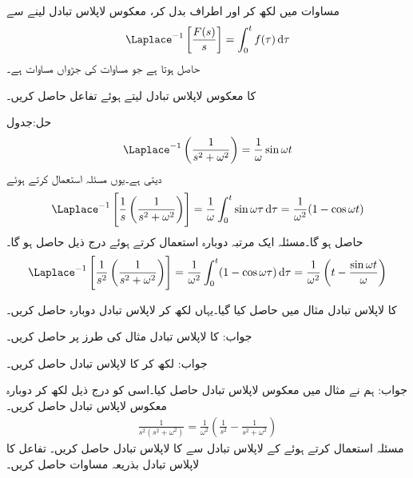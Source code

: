 مساوات  میں  لکھ کر اور اطراف بدل کر، معکوس لاپلاس تبادل لینے سے
\begin{align}\label{مساوات_لاپلاس_تکمل_کا_بدل_جڑواں}
\Laplace^{-1}\left[\frac{F(s)}{s}\right]=\int_{0}^{t} f(\tau)\dif \tau
\end{align}
حاصل ہوتا ہے جو مساوات  کی جڑواں مساوات ہے۔

 کا معکوس لاپلاس تبادل لیتے ہوئے تفاعل  حاصل کریں۔

حل:جدول  
\begin{align*}
\Laplace^{-1}\left(\frac{1}{s^2+\omega^2}\right)=\frac{1}{\omega}\sin \omega t
\end{align*}
دیتی ہے۔یوں مسئلہ  استعمال کرتے ہوئے
\begin{align*}
\Laplace^{-1}\left[\frac{1}{s}\left(\frac{1}{s^2+\omega^2}\right)\right]=\frac{1}{\omega} \int_{0}^{t}\sin \omega \tau \dif \tau=\frac{1}{\omega^2} (1-\cos \omega t)
\end{align*}
حاصل ہو گا۔مسئلہ  ایک مرتبہ دوبارہ استعمال کرتے ہوئے درج ذیل حاصل ہو گا۔
\begin{align*}
\Laplace^{-1}\left[\frac{1}{s^2} \left(\frac{1}{s^2+\omega^2}\right)\right]=\frac{1}{\omega^2} \int_{0}^{t}(1-\cos \omega \tau) \dif \tau=\frac{1}{\omega^2}\left(t-\frac{\sin \omega t}{\omega}\right)
\end{align*}


 کا لاپلاس تبادل مثال  میں حاصل کیا گیا۔یہاں  لکھ کر لاپلاس تبادل دوبارہ حاصل کریں۔

جواب:
 کا لاپلاس تبادل مثال  کی طرز پر حاصل کریں۔

جواب:
 لکھ کر  کا لاپلاس تبادل حاصل کریں۔

جواب:
ہم نے مثال  میں معکوس لاپلاس تبادل حاصل کیا۔اسی کو درج ذیل لکھ کر دوبارہ معکوس لاپلاس تبادل حاصل کریں۔
\begin{align*}
\frac{1}{s^2(s^2+\omega^2)}=\frac{1}{\omega^2}\left(\frac{1}{s^2}-\frac{1}{s^2+\omega^2}\right)
\end{align*}
مسئلہ  استعمال کرتے ہوئے  کے لاپلاس تبادل سے  کا لاپلاس تبادل حاصل کریں۔ 
تفاعل  کا لاپلاس تبادل بذریعہ مساوات  حاصل کریں۔

